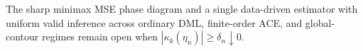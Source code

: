 The sharp minimax MSE phase diagram and a single data-driven estimator with uniform valid inference across ordinary DML, finite-order ACE, and global-contour regimes remain open when \(|\kappa_k(\eta_n)|\ge\delta_n\downarrow0\).